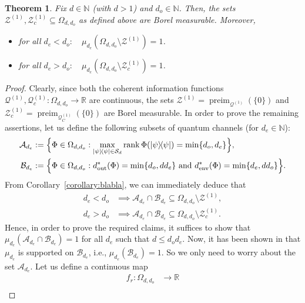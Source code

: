 \documentclass[a4paper,onecolumn,10pt,accepted=2022-07-11]{quantumarticle}
\newcommand{\St}[1]{\mathcal{S}_{#1}}
\newcommand{\env}{\operatorname{env}}
\newcommand{\out}{\operatorname{out}}
\newtheorem{theorem}{Theorem}[section]
\theoremstyle{definition}
\begin{document}
\begin{theorem}\label{theorem:Smain}
Fix $d\in \mathbb{N}$ (with $d>1$) and $d_o\in \mathbb{N}$. Then, the sets $\mathcal{Z}^{(1)},\mathcal{Z}^{(1)}_c\subseteq \Omega_{d,d_o}$ as defined above are Borel measurable. Moreover,
\begin{itemize}
    \item for all $d_e<d_o: \quad \mu_{d_e}(\Omega_{d,d_o} \setminus \mathcal{Z}^{(1)})=1$.
    \item for all $d_e>d_o:\quad  \mu_{d_e}(\Omega_{d,d_o} \setminus \mathcal{Z}^{(1)}_c)=1$.
\end{itemize}
\end{theorem}
\begin{proof}
Clearly, since both the coherent information functions $\mathcal{Q}^{(1)},\mathcal{Q}^{(1)}_c:\Omega_{d,d_o}\to \mathbb{R}$ are continuous, the sets $\mathcal{Z}^{(1)}=\operatorname{preim}_{\mathcal{Q}^{(1)}}(\{0\})$ and $\mathcal{Z}^{(1)}_c=\operatorname{preim}_{\mathcal{Q}^{(1)}_C}(\{0\})$ are Borel measurable. In order to prove the remaining assertions, let us define the following subsets of quantum channels (for $d_e\in\mathbb{N}$):
\begin{align*}
    \mathcal{A}_{d_e} &:= \Big\{\Phi\in \Omega_{d,d_o} : \max_{\ketbra{\psi}\in\St{d}} \operatorname{rank} \Phi(\ketbra{\psi}) = \min \{d_o,d_e \} \Big\}, \\
    \mathcal{B}_{d_e} &:= \Big\{  \Phi\in\Omega_{d,d_o} : d^*_{\out}(\Phi)=\min\{d_o,dd_e\} \text{ and } d^*_{\env}(\Phi)=\min\{d_e,dd_o\}  \Big\}.
\end{align*}
From Corollary~\ref{corollary:blabla}, we can immediately deduce that
\begin{align*}
    d_e<d_o &\implies \mathcal{A}_{d_e} \cap \mathcal{B}_{d_e} \subseteq \Omega_{d,d_o} \setminus \mathcal{Z}^{(1)},  \\
    d_e>d_o &\implies \mathcal{A}_{d_e} \cap \mathcal{B}_{d_e} \subseteq \Omega_{d,d_o} \setminus \mathcal{Z}^{(1)}_c.
\end{align*}
Hence, in order to prove the required claims, it suffices to show that $\mu_{d_e}(\mathcal{A}_{d_e} \cap \mathcal{B}_{d_e})=1$ for all $d_e$ such that $d\leq d_od_e$. Now, it has been shown in \cite[Eq. (15) and Proposition 2]{kukulski2021generating} that $\mu_{d_e}$ is supported on $\mathcal{B}_{d_e}$, i.e., $\mu_{d_e}(\mathcal{B}_{d_e})=1$. So we only need to worry about the set $\mathcal{A}_{d_e}$. Let us define a continuous map
\begin{align*}
    f_r:\Omega_{d,d_o} &\to \mathbb{R} \\

\end{align*}
\end{proof}
\end{document}
